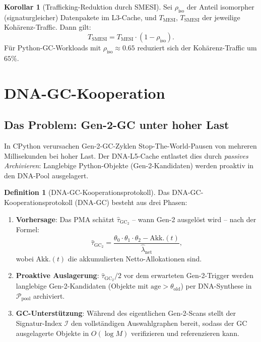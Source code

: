 ﻿\documentclass[a4paper,12pt]{article}
\theoremstyle{definition}
\newtheorem{definition}{Definition}[section]
\newtheorem{korollar}{Korollar}[section]
\begin{document}
\begin{korollar}[Trafficking-Reduktion durch SMESI]
  \label{kor:smesi_traffic}
  Sei $\rho_{\mathrm{iso}}$ der Anteil isomorpher (signaturgleicher) Datenpakete
  im L3-Cache, und $T_{\mathrm{MESI}}$, $T_{\mathrm{SMESI}}$ der jeweilige
  Kohärenz-Traffic. Dann gilt:
  \[
    T_{\mathrm{SMESI}} = T_{\mathrm{MESI}} \cdot (1 - \rho_{\mathrm{iso}}).
  \]
  Für Python-GC-Workloads mit $\rho_{\mathrm{iso}} \approx 0.65$
  reduziert sich der Kohärenz-Traffic um $65\%$.
\end{korollar}

\section{DNA-GC-Kooperation}

\subsection{Das Problem: Gen-2-GC unter hoher Last}

In CPython verursachen Gen-2-GC-Zyklen Stop-The-World-Pausen von
mehreren Millisekunden bei hoher Last. Der DNA-L5-Cache entlastet
dies durch \emph{passives Archivieren}: Langlebige Python-Objekte
(Gen-2-Kandidaten) werden proaktiv in den DNA-Pool ausgelagert.

\begin{definition}[DNA-GC-Kooperationsprotokoll]
  \label{def:dna_gc}
  Das DNA-GC-Kooperationsprotokoll ($\mathrm{DNA\text{-}GC}$) besteht
  aus drei Phasen:
  \begin{enumerate}[noitemsep]
    \item \textbf{Vorhersage}: Das PMA schätzt $\hat\tau_{\mathrm{GC}_2}$
      -- wann Gen-2 ausgelöst wird -- nach der Formel:
      \[
        \hat\tau_{\mathrm{GC}_2} = \frac{\theta_0 \cdot \theta_1 \cdot \theta_2
        - \text{Akk.}(t)}{\hat\lambda_{\mathrm{net}}},
      \]
      wobei $\text{Akk.}(t)$ die akkumulierten Netto-Allokationen sind.
    \item \textbf{Proaktive Auslagerung}: $\hat\tau_{\mathrm{GC}_2} / 2$
      vor dem erwarteten Gen-2-Trigger werden langlebige Gen-2-Kandidaten
      (Objekte mit $\mathrm{age} > \theta_{\mathrm{old}}$) per
      DNA-Synthese in $\mathcal{P}_{\mathrm{pool}}$ archiviert.
    \item \textbf{GC-Unterstützung}: Während des eigentlichen Gen-2-Scans
      stellt der Signatur-Index $\mathcal{I}$ den vollständigen
      Auswahlgraphen bereit, sodass der GC ausgelagerte Objekte in
      $O(\log M)$ verifizieren und referenzieren kann.
  \end{enumerate}
\end{definition}
\end{document}
